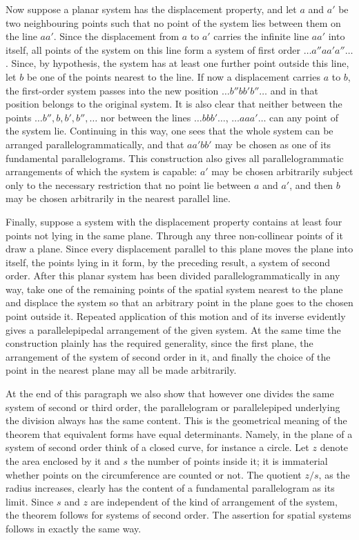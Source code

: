 \documentclass[11pt]{article}
\begin{document}
Now suppose a planar system has the displacement property, and let $a$ and $a'$ be two neighbouring points such that no point of the system lies between them on the line $aa'$. Since the displacement from $a$ to $a'$ carries the infinite line $aa'$ into itself, all points of the system on this line form a system of first order $\ldots a''aa'a''\ldots$. Since, by hypothesis, the system has at least one further point outside this line, let $b$ be one of the points nearest to the line. If now a displacement carries $a$ to $b$, the first-order system passes into the new position $\ldots b''bb'b''\ldots$ and in that position belongs to the original system. It is also clear that neither between the points $\ldots b'',b,b',b'',\ldots$ nor between the lines $\ldots bbb'\ldots$, $\ldots aaa'\ldots$ can any point of the system lie. Continuing in this way, one sees that the whole system can be arranged parallelogrammatically, and that $aa'bb'$ may be chosen as one of its fundamental parallelograms. This construction also gives all parallelogrammatic arrangements of which the system is capable: $a'$ may be chosen arbitrarily subject only to the necessary restriction that no point lie between $a$ and $a'$, and then $b$ may be chosen arbitrarily in the nearest parallel line.

Finally, suppose a system with the displacement property contains at least four points not lying in the same plane. Through any three non-collinear points of it draw a plane. Since every displacement parallel to this plane moves the plane into itself, the points lying in it form, by the preceding result, a system of second order. After this planar system has been divided parallelogrammatically in any way, take one of the remaining points of the spatial system nearest to the plane and displace the system so that an arbitrary point in the plane goes to the chosen point outside it. Repeated application of this motion and of its inverse evidently gives a parallelepipedal arrangement of the given system. At the same time the construction plainly has the required generality, since the first plane, the arrangement of the system of second order in it, and finally the choice of the point in the nearest plane may all be made arbitrarily.

At the end of this paragraph we also show that however one divides the same system of second or third order, the parallelogram or parallelepiped underlying the division always has the same content. This is the geometrical meaning of the theorem that equivalent forms have equal determinants. Namely, in the plane of a system of second order think of a closed curve, for instance a circle. Let $z$ denote the area enclosed by it and $s$ the number of points inside it; it is immaterial whether points on the circumference are counted or not. The quotient $z/s$, as the radius increases, clearly has the content of a fundamental parallelogram as its limit. Since $s$ and $z$ are independent of the kind of arrangement of the system, the theorem follows for systems of second order. The assertion for spatial systems follows in exactly the same way.
\end{document}
